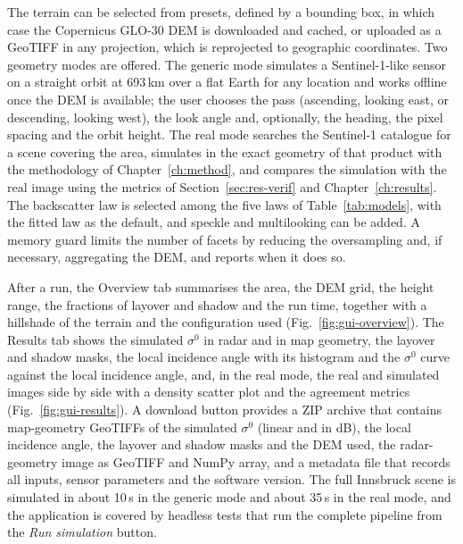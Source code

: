 The terrain can be selected from presets, defined by a bounding box, in which case the Copernicus GLO-30 DEM is
downloaded and cached, or uploaded as a GeoTIFF in any projection, which is reprojected to geographic coordinates.
Two geometry modes are offered. The generic mode simulates a Sentinel-1-like sensor on a straight orbit at 693\,km over
a flat Earth for any location and works offline once the DEM is available; the user chooses the pass (ascending,
looking east, or descending, looking west), the look angle and, optionally, the heading, the pixel spacing and the
orbit height. The real mode searches the Sentinel-1 catalogue for a scene covering the area, simulates in the exact
geometry of that product with the methodology of Chapter~\ref{ch:method}, and compares the simulation with the real
image using the metrics of Section~\ref{sec:res-verif} and Chapter~\ref{ch:results}. The backscatter law is selected
among the five laws of Table~\ref{tab:models}, with the fitted law as the default, and speckle and multilooking can be
added. A memory guard limits the number of facets by reducing the oversampling and, if necessary, aggregating the DEM,
and reports when it does so.

After a run, the Overview tab summarises the area, the DEM grid, the height range, the fractions of layover and
shadow and the run time, together with a hillshade of the terrain and the configuration used
(Fig.~\ref{fig:gui-overview}). The Results tab shows the simulated $\sigma^0$ in radar and in map geometry, the layover
and shadow masks, the local incidence angle with its histogram and the $\sigma^0$ curve against the local incidence
angle, and, in the real mode, the real and simulated images side by side with a density scatter plot and the
agreement metrics (Fig.~\ref{fig:gui-results}). A download button provides a ZIP archive that contains map-geometry
GeoTIFFs of the simulated $\sigma^0$ (linear and in dB), the local incidence angle, the layover and shadow masks and the
DEM used, the radar-geometry image as GeoTIFF and NumPy array, and a metadata file that records all inputs, sensor
parameters and the software version. The full Innsbruck scene is simulated in about 10\,s in the generic mode and
about 35\,s in the real mode, and the application is covered by headless tests that run the complete pipeline from the
\emph{Run simulation} button.

